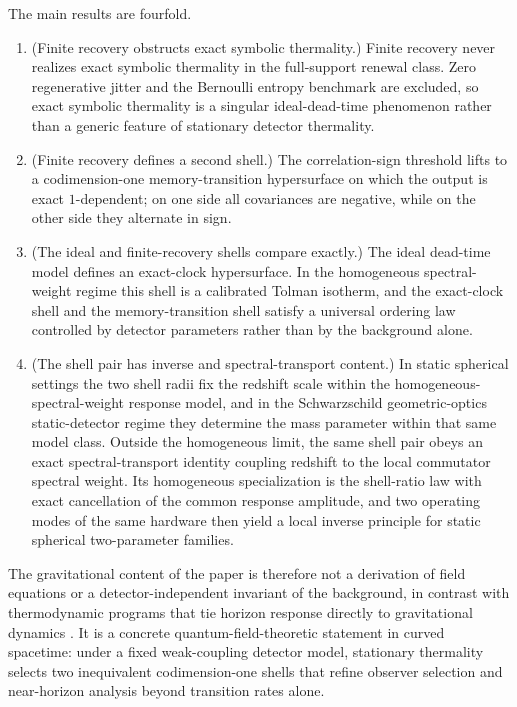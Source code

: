 The main results are fourfold.
\begin{enumerate}[label=\textup{(\roman*)},leftmargin=*,itemsep=4pt]
\item \textup{(Finite recovery obstructs exact symbolic thermality.)} Finite recovery never realizes exact symbolic thermality in the full-support renewal class. Zero regenerative jitter and the Bernoulli entropy benchmark are excluded, so exact symbolic thermality is a singular ideal-dead-time phenomenon rather than a generic feature of stationary detector thermality.
\item \textup{(Finite recovery defines a second shell.)} The correlation-sign threshold lifts to a codimension-one memory-transition hypersurface on which the output is exact $1$-dependent; on one side all covariances are negative, while on the other side they alternate in sign.
\item \textup{(The ideal and finite-recovery shells compare exactly.)} The ideal dead-time model defines an exact-clock hypersurface. In the homogeneous spectral-weight regime this shell is a calibrated Tolman isotherm, and the exact-clock shell and the memory-transition shell satisfy a universal ordering law controlled by detector parameters rather than by the background alone.
\item \textup{(The shell pair has inverse and spectral-transport content.)} In static spherical settings the two shell radii fix the redshift scale within the homogeneous-spectral-weight response model, and in the Schwarzschild geometric-optics static-detector regime they determine the mass parameter within that same model class. Outside the homogeneous limit, the same shell pair obeys an exact spectral-transport identity coupling redshift to the local commutator spectral weight. Its homogeneous specialization is the shell-ratio law with exact cancellation of the common response amplitude, and two operating modes of the same hardware then yield a local inverse principle for static spherical two-parameter families.
\end{enumerate}

The gravitational content of the paper is therefore not a derivation of field equations or a detector-independent invariant of the background, in contrast with thermodynamic programs that tie horizon response directly to gravitational dynamics \cite{Jacobson1995}. It is a concrete quantum-field-theoretic statement in curved spacetime: under a fixed weak-coupling detector model, stationary thermality selects two inequivalent codimension-one shells that refine observer selection and near-horizon analysis beyond transition rates alone.

